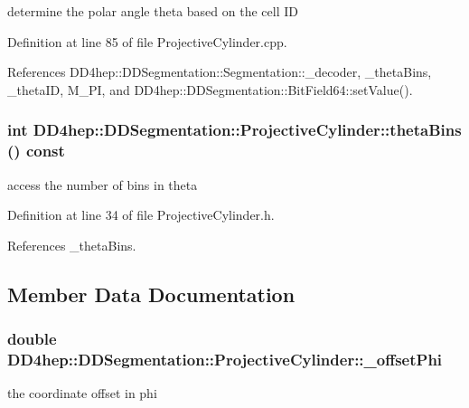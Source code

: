determine the polar angle theta based on the cell ID 

Definition at line 85 of file ProjectiveCylinder.cpp.

References DD4hep::DDSegmentation::Segmentation::\_\-decoder, \_\-thetaBins, \_\-thetaID, M\_\-PI, and DD4hep::DDSegmentation::BitField64::setValue().\hypertarget{class_d_d4hep_1_1_d_d_segmentation_1_1_projective_cylinder_a4fd2d5c187777527964abfeb79629eca}{
\subsubsection[{thetaBins}]{\setlength{\rightskip}{0pt plus 5cm}int DD4hep::DDSegmentation::ProjectiveCylinder::thetaBins () const}}
\label{class_d_d4hep_1_1_d_d_segmentation_1_1_projective_cylinder_a4fd2d5c187777527964abfeb79629eca}


access the number of bins in theta 

Definition at line 34 of file ProjectiveCylinder.h.

References \_\-thetaBins.

\subsection{Member Data Documentation}
\hypertarget{class_d_d4hep_1_1_d_d_segmentation_1_1_projective_cylinder_aef1c8efbfba086c1df77dee8d24eb877}{
\subsubsection[{\_\-offsetPhi}]{\setlength{\rightskip}{0pt plus 5cm}double {\bf DD4hep::DDSegmentation::ProjectiveCylinder::\_\-offsetPhi}}}
\label{class_d_d4hep_1_1_d_d_segmentation_1_1_projective_cylinder_aef1c8efbfba086c1df77dee8d24eb877}


the coordinate offset in phi 

